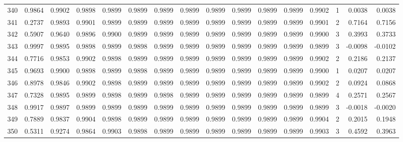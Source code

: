 \begin{tabular}{lrrrrrrrrrrrrrrr}
340 &      0.9864 &  0.9902 &  0.9898 &  0.9899 &  0.9899 &  0.9899 &  0.9899 &  0.9899 &  0.9899 &  0.9899 &   0.9899 &     0.9902 &      1 &                    0.0038 &                     0.0038 \\
341 &      0.2737 &  0.9893 &  0.9901 &  0.9899 &  0.9899 &  0.9899 &  0.9899 &  0.9899 &  0.9899 &  0.9899 &   0.9899 &     0.9901 &      2 &                    0.7164 &                     0.7156 \\
342 &      0.5907 &  0.9640 &  0.9896 &  0.9900 &  0.9899 &  0.9899 &  0.9899 &  0.9899 &  0.9899 &  0.9899 &   0.9899 &     0.9900 &      3 &                    0.3993 &                     0.3733 \\
343 &      0.9997 &  0.9895 &  0.9898 &  0.9899 &  0.9898 &  0.9899 &  0.9899 &  0.9899 &  0.9899 &  0.9899 &   0.9899 &     0.9899 &      3 &                   -0.0098 &                    -0.0102 \\
344 &      0.7716 &  0.9853 &  0.9902 &  0.9898 &  0.9899 &  0.9899 &  0.9899 &  0.9899 &  0.9899 &  0.9899 &   0.9899 &     0.9902 &      2 &                    0.2186 &                     0.2137 \\
345 &      0.9693 &  0.9900 &  0.9898 &  0.9899 &  0.9898 &  0.9899 &  0.9899 &  0.9899 &  0.9899 &  0.9899 &   0.9899 &     0.9900 &      1 &                    0.0207 &                     0.0207 \\
346 &      0.8978 &  0.9846 &  0.9902 &  0.9898 &  0.9899 &  0.9899 &  0.9899 &  0.9899 &  0.9899 &  0.9899 &   0.9899 &     0.9902 &      2 &                    0.0924 &                     0.0868 \\
347 &      0.7328 &  0.9895 &  0.9899 &  0.9898 &  0.9899 &  0.9898 &  0.9899 &  0.9899 &  0.9899 &  0.9899 &   0.9899 &     0.9899 &      4 &                    0.2571 &                     0.2567 \\
348 &      0.9917 &  0.9897 &  0.9899 &  0.9899 &  0.9899 &  0.9899 &  0.9899 &  0.9899 &  0.9899 &  0.9899 &   0.9899 &     0.9899 &      3 &                   -0.0018 &                    -0.0020 \\
349 &      0.7889 &  0.9837 &  0.9904 &  0.9898 &  0.9899 &  0.9899 &  0.9899 &  0.9899 &  0.9899 &  0.9899 &   0.9899 &     0.9904 &      2 &                    0.2015 &                     0.1948 \\
350 &      0.5311 &  0.9274 &  0.9864 &  0.9903 &  0.9898 &  0.9899 &  0.9899 &  0.9899 &  0.9899 &  0.9899 &   0.9899 &     0.9903 &      3 &                    0.4592 &                     0.3963 \\

\end{tabular}
